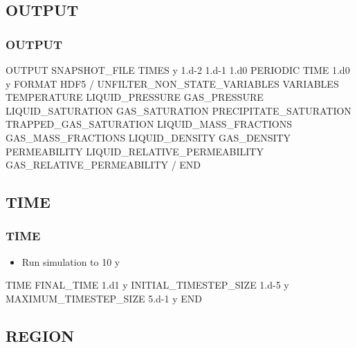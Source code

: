 \documentclass{beamer}
\begin{document}
\subsection{OUTPUT}

\begin{frame}\frametitle{OUTPUT}

\begin{semiverbatim}

OUTPUT
  SNAPSHOT_FILE
    TIMES y 1.d-2 1.d-1 1.d0
    PERIODIC TIME 1.d0 y
    FORMAT HDF5
  /
  UNFILTER_NON_STATE_VARIABLES
\newpage  VARIABLES
   TEMPERATURE
   LIQUID_PRESSURE
   GAS_PRESSURE
   LIQUID_SATURATION
   GAS_SATURATION
   PRECIPITATE_SATURATION
   TRAPPED_GAS_SATURATION
   LIQUID_MASS_FRACTIONS
   GAS_MASS_FRACTIONS
   LIQUID_DENSITY
   GAS_DENSITY
   PERMEABILITY
   LIQUID_RELATIVE_PERMEABILITY
   GAS_RELATIVE_PERMEABILITY
  /
END
\end{semiverbatim}

\end{frame}

\subsection{TIME}

\begin{frame}[fragile]\frametitle{TIME}

\begin{itemize}
\item Run simulation to 10 y
\end{itemize}

\begin{semiverbatim}

TIME
  FINAL_TIME 1.d1 y
  INITIAL_TIMESTEP_SIZE 1.d-5 y
  MAXIMUM_TIMESTEP_SIZE 5.d-1 y
END

\end{semiverbatim}

\end{frame}

\subsection{REGION}
\end{document}
